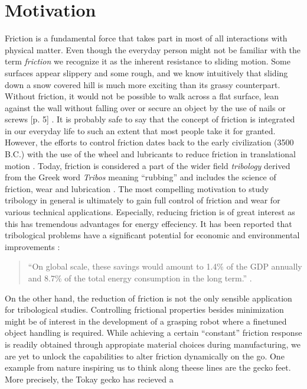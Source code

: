 \section{Motivation}
Friction is a fundamental force that takes part in most of all interactions with
physical matter. Even though the everyday person might not be familiar with the
term \textit{friction} we recognize it as the inherent resistance to sliding
motion. Some surfaces appear slippery and some rough, and we know intuitively
that sliding down a snow covered hill is much more exciting than its grassy
counterpart. Without friction, it would not be possible to walk across a flat
surface, lean against the wall without falling over or secure an object by the
use of nails or screws [p. 5] \cite{gnecco_meyer_2015}. It is probably safe to
say that the concept of friction is integrated in our everyday life to such an
extent that most people take it for granted. However, the efforts to control
friction dates back to the early civilization (3500 B.C.) with the use of the
wheel and lubricants to reduce friction in translational motion
\cite{bhushan_2013}. Today, friction is considered a part of the wider field
\textit{tribology} derived from the Greek word \textit{Tribos} meaning
``rubbing'' and includes the science of friction, wear and lubrication
\cite{bhushan_2013}. The most compelling motivation to study tribology in
general is ultimately to gain full control of friction and wear for various
technical applications. Especially, reducing friction is of great interest as
this has tremendous advantages for energy effeciency. It has been reported that
tribological problems have a significant potential for economic and
environmental improvements \cite{kim_nano-scale_2009}:
\begin{quote}
    ``On global scale, these savings would amount to 1.4\% of the GDP annually
    and 8.7\% of the total energy consumption in the long term.''
    \cite{holmberg_influence_2017}. 
\end{quote}
On the other hand, the reduction of friction is not the only sensible
application for tribological studies. Controlling frictional properties besides
minimization might be of interest in the development of a grasping robot where a
finetuned object handling is required. While achieving a certain ``constant''
friction response is readily obtained through appropiate material choices during
manufacturing, we are yet to unlock the capabilities to alter friction
dynamically on the go. One example from nature inspiring us to think along
theese lines are the gecko feet. More precisely, the Tokay gecko has recieved a
